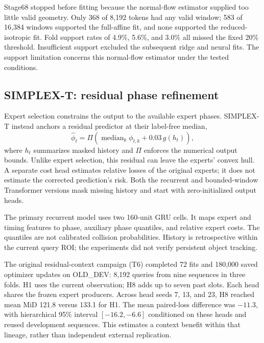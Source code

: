 Stage68 stopped before fitting because the normal-flow estimator supplied too little valid geometry. Only 368 of 8,192 tokens had any valid window; 583 of 16,384 windows supported the full-affine fit, and none supported the reduced-isotropic fit. Fold support rates of 4.9\%, 5.6\%, and 3.0\% all missed the fixed 20\% threshold. Insufficient support excluded the subsequent ridge and neural fits. The support limitation concerns this normal-flow estimator under the tested conditions. 

\subsection{SIMPLEX-T: residual phase refinement}

Expert selection constrains the output to the available expert phases. SIMPLEX-T instead anchors a residual predictor at their label-free median,
\begin{equation}
 \hat\phi_t=\Pi\!\left(\operatorname{median}_{k}\phi_{t,k}
                  +0.03\,g(h_t)\right),
\end{equation}
where $h_t$ summarizes masked history and $\Pi$ enforces the numerical output bounds. Unlike expert selection, this residual can leave the experts' convex hull. A separate cost head estimates relative losses of the original experts; it does not estimate the corrected prediction's risk. Both the recurrent and bounded-window Transformer versions mask missing history and start with zero-initialized output heads.

The primary recurrent model uses two 160-unit GRU cells. It maps expert and timing features to phase, auxiliary phase quantiles, and relative expert costs. The quantiles are not calibrated collision probabilities. History is retrospective within the current query ROI; the experiments did not verify persistent object tracking.

The original residual-context campaign (T6) completed 72 fits and 180,000 saved optimizer updates on OLD\_DEV: 8,192 queries from nine sequences in three folds. H1 uses the current observation; H8 adds up to seven past slots. Each head shares the frozen expert producers. Across head seeds 7, 13, and 23, H8 reached mean MiD 121.8 versus 133.1 for H1. The mean paired-loss difference was $-11.3$, with hierarchical 95\% interval $[-16.2,-6.6]$ conditioned on these heads and reused development sequences. This estimates a context benefit within that lineage, rather than independent external replication. 

